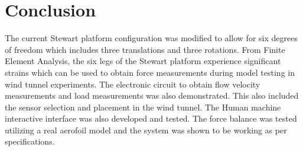 \section{Conclusion}
The current Stewart platform configuration was modified to allow for six degrees of freedom which includes three translations and three rotations.
From Finite Element Analysis, the six legs of the Stewart platform experience significant strains which can be used to obtain force measurements during model testing in wind tunnel experiments.
The electronic circuit to obtain flow velocity measurements and load measurements was also demonstrated. This also included the sensor selection and placement in the wind tunnel. 
The Human machine interactive interface was also developed and tested. 
The force balance was tested utilizing a real aerofoil model and the system was shown to be working as per specifications.